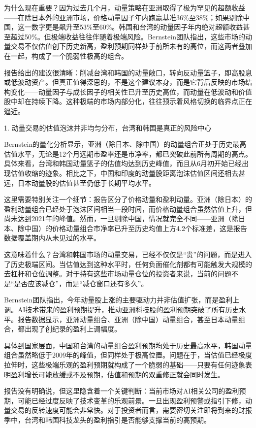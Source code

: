 \documentclass[11pt]{ctexart}
\begin{document}
为什么现在重要？因为过去几个月，动量策略在亚洲取得了极为罕见的超额收益——在除日本外的亚洲市场，价格动量因子年内跑赢基准36\%至38\%；如果剔除中国，这一数字更是飙升至53\%至60\%。韩国和台湾的动量因子年内绝对超额收益甚至超过50\%。但极端收益往往伴随着极端风险。Bernstein团队指出，这些市场的动量交易不仅估值创下历史新高，盈利预期同样处于前所未有的高位，而这两者叠加在一起，构成了一个脆弱性极高的组合。

报告给出的建议很清晰：削减台湾和韩国的动量敞口，转向反动量篮子，即高股息或低波动资产。但真正值得深思的，不是这个建议本身，而是它背后反映的市场结构变化——动量因子与成长因子的相关性已升至历史高位，而动量在低波动和价值股中却在持续下降。这种极端的市场内部分化，往往预示着风格切换的临界点正在逼近。

1. 动量交易的估值泡沫并非均匀分布，台湾和韩国是真正的风险中心

Bernstein的量化分析显示，亚洲（除日本、除中国）的动量组合正处于历史最高估值水平，无论是12个月远期市盈率还是市净率，都已突破此前所有周期的高点。具体来看，台湾和韩国动量篮子的估值均达到历史峰值，而且从6月初开始已经出现估值收缩的迹象。相比之下，中国和印度的动量股距离泡沫估值区间还相去甚远，日本动量股的估值甚至仍低于长期平均水平。

这里需要特别关注一个细节：报告区分了价格动量和盈利动量。亚洲（除日本）的盈利动量组合已经处于泡沫区间相当一段时间，而价格动量组合虽然估值上升，但尚未达到2021年的峰值。然而，一旦剔除中国，情况就完全不同——亚洲（除日本、除中国）的价格动量组合市净率已升至历史均值上方4.2个标准差，这是报告数据覆盖期内从未见过的水平。

这意味着什么？台湾和韩国市场的动量交易，已经不仅仅是“贵”的问题，而是进入了历史极端区间。当估值达到这种水平时，任何负面催化剂都有可能触发大规模的去杠杆和仓位调整。对于持有这些市场动量仓位的投资者来说，当前的问题不是“是否应该减仓”，而是“减仓窗口还有多久”。

Bernstein团队指出，今年动量股上涨的主要驱动力并非估值扩张，而是盈利上调。AI技术带来的盈利预期提升，推动亚洲科技股的盈利预期突破了所有历史水平。报告数据显示，亚洲动量组合、亚洲（除中国）动量组合，甚至日本动量组合，都出现了创纪录的盈利上调幅度。

具体到国家层面，中国和台湾的动量组合盈利预期均处于历史最高水平，韩国动量组合虽然略低于2009年的峰值，但同样处于极高位置。问题在于，当估值已经极度拉伸时，这些极端乐观的盈利预期就构成了一个脆弱的基础——只要有任何迹象表明盈利增长可能放缓或不及预期，估值和预期的双重修正就会同时发生。

报告没有明确说，但这里隐含着一个关键判断：当前市场对AI相关公司的盈利预期，可能已经过度反映了技术变革的乐观前景。一旦出现盈利预警或指引下修，动量交易的反转速度可能会非常快。对于投资者而言，需要密切关注即将到来的财报季中，台湾和韩国科技龙头的盈利指引是否能够支撑当前的高预期。
\end{document}
